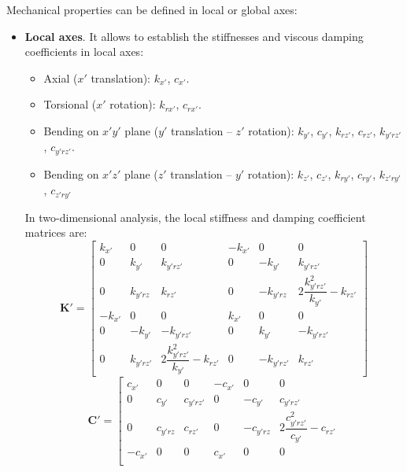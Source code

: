 \documentclass[a4paper,fleqn]{book}
\begin{document}
Mechanical properties can be defined in local or global axes:
\begin{itemize}
    \item \textbf{Local axes}. It allows to establish the stiffnesses and viscous damping coefficients in local axes:
    \begin{itemize}
      \item Axial ($x'$ translation): $k_{x'}$, $c_{x'}$.
      \item Torsional ($x'$ rotation): $k_{rx'}$, $c_{rx'}$.
      \item Bending on $x'y'$ plane ($y'$ translation -- $z'$ rotation): $k_{y'}$, $c_{y'}$, $k_{rz'}$, $c_{rz'}$, $k_{y'rz'}$, $c_{y'rz'}$.
      \item Bending on $x'z'$ plane ($z'$ translation -- $y'$ rotation): $k_{z'}$, $c_{z'}$, $k_{ry'}$, $c_{ry'}$, $k_{z'ry'}$, $c_{z'ry'}$
    \end{itemize}
    In two-dimensional analysis, the local stiffness and damping coefficient matrices are:
    \begin{equation}
    \mathbf{K}'
    =
    \left[
    \begin{array}{ccc|ccc}
    k_{x'} &   0      &         0 & -k_{x'} &       0 &        0  \\
    0      &   k_{y'} & k_{y'rz'} &       0 & -k_{y'} & k_{y'rz'}\\
    0      & k_{y'rz} &   k_{rz'} &       0 & -k_{y'rz} & 2\dfrac{k_{y'rz'}^2}{k_{y'}}-k_{rz'} \\
    \hline
   -k_{x'} &   0      &         0 &  k_{x'} &      0 &        0    \\
        0  & -k_{y'}  &-k_{y'rz'} &       0 & k_{y'} & -k_{y'rz'}  \\
        0  & k_{y'rz'} & 2\dfrac{k_{y'rz'}^2}{k_{y'}}-k_{rz'} & 0 & -k_{y'rz'} & k_{rz'}
    \end{array}
    \right]
    \end{equation}
    \begin{equation}
    \mathbf{C}'
    =
    \left[
    \begin{array}{ccc|ccc}
    c_{x'} &   0      &         0 & -c_{x'} &       0 &        0  \\
    0      &   c_{y'} & c_{y'rz'} &       0 & -c_{y'} & c_{y'rz'}\\
    0      & c_{y'rz} &   c_{rz'} &       0 & -c_{y'rz} & 2\dfrac{c_{y'rz'}^2}{c_{y'}}-c_{rz'} \\
    \hline
   -c_{x'} &   0      &         0 &  c_{x'} &      0 &        0    \\

\end{array}
\end{equation}
\end{itemize}
\end{document}
